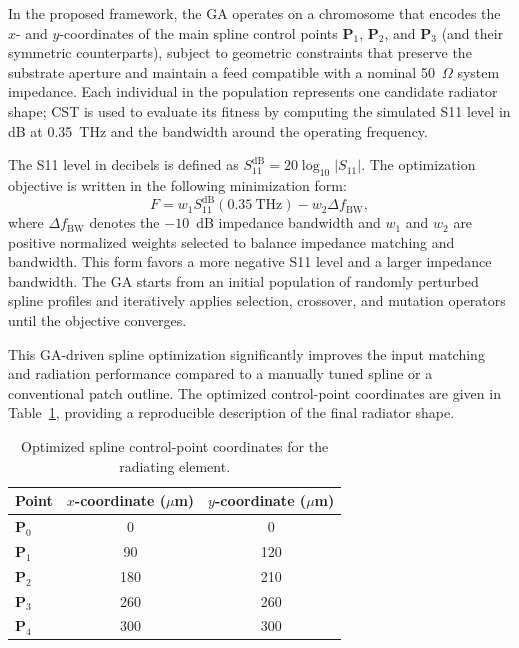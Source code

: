 \documentclass[a4paper,fleqn]{cas-dc}
\begin{document}
In the proposed framework, the GA operates on a chromosome that encodes the $x$- and $y$-coordinates of the main spline control points $\mathbf{P}_1$, $\mathbf{P}_2$, and $\mathbf{P}_3$ (and their symmetric counterparts), subject to geometric constraints that preserve the substrate aperture and maintain a feed compatible with a nominal 50~$\Omega$ system impedance. Each individual in the population represents one candidate radiator shape; CST is used to evaluate its fitness by computing the simulated S11 level in dB at 0.35~THz and the bandwidth around the operating frequency.

The S11 level in decibels is defined as $S_{11}^{\mathrm{dB}}=20\log_{10}\lvert S_{11}\rvert$. The optimization objective is written in the following minimization form:
\[
F = w_1 S_{11}^{\mathrm{dB}}(0.35~\text{THz}) - w_2 \Delta f_{\text{BW}},
\]
where $\Delta f_{\text{BW}}$ denotes the \(-10\)~dB impedance bandwidth and $w_1$ and $w_2$ are positive normalized weights selected to balance impedance matching and bandwidth. This form favors a more negative S11 level and a larger impedance bandwidth. The GA starts from an initial population of randomly perturbed spline profiles and iteratively applies selection, crossover, and mutation operators until the objective converges.

This GA-driven spline optimization significantly improves the input matching and radiation performance compared to a manually tuned spline or a conventional patch outline. The optimized control-point coordinates are given in Table~\ref{tab:spline_points}, providing a reproducible description of the final radiator shape.

\begin{table}[ht]
\centering
\caption{Optimized spline control-point coordinates for the radiating element.}
\label{tab:spline_points}
\begin{tabular}{@{}lcc@{}}
\toprule
\textbf{Point} & \textbf{$x$-coordinate ($\mu$m)} & \textbf{$y$-coordinate ($\mu$m)} \\
\midrule
$\mathbf{P}_0$ & 0   & 0   \\
$\mathbf{P}_1$ & 90  & 120 \\
$\mathbf{P}_2$ & 180 & 210 \\
$\mathbf{P}_3$ & 260 & 260 \\
$\mathbf{P}_4$ & 300 & 300 \\
\bottomrule
\end{tabular}
\end{table}
\end{document}

